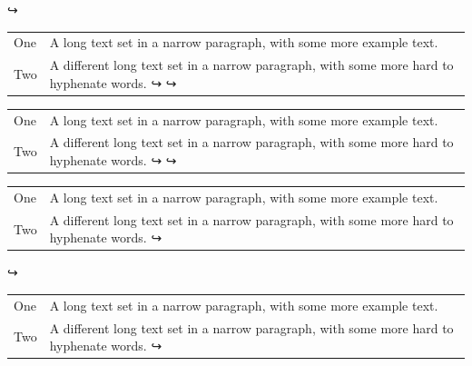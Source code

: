 \documentclass[a4paper]{article}
\begin{document}
 \begin{table}
 ↪
 \begin{tabular}[t]{lp{3cm}}
 One & A long text set in a narrow paragraph, with some more
 example text.\\
 Two & A different long text set in a narrow paragraph, with
 some more hard to hyphenate words.
 ↪
 ↪
 \end{tabular}%
 \begin{tabular}[t]{l>{\raggedright\arraybackslash}p{3cm}}
 One & A long text set in a narrow paragraph, with some more
 example text.\\
 Two & A different long text set in a narrow paragraph, with
 some more hard to hyphenate words.
 ↪
 ↪
 \end{tabular}%
 \begin{tabular}[t]{l>{\RaggedRight}p{3cm}}
 One & A long text set in a narrow paragraph, with some more
 example text.\\
 Two & A different long text set in a narrow paragraph, with
 some more hard to hyphenate words.
 ↪
 \end{tabular}
 ↪
 \footnotesize
 \begin{tabular}[t]{lp{3cm}}
 One & A long text set in a narrow paragraph, with some more
 example text.\\
 Two & A different long text set in a narrow paragraph, with
 some more hard to hyphenate words.
 ↪
 \end{tabular}
 \end{table}
 
\end{document}
